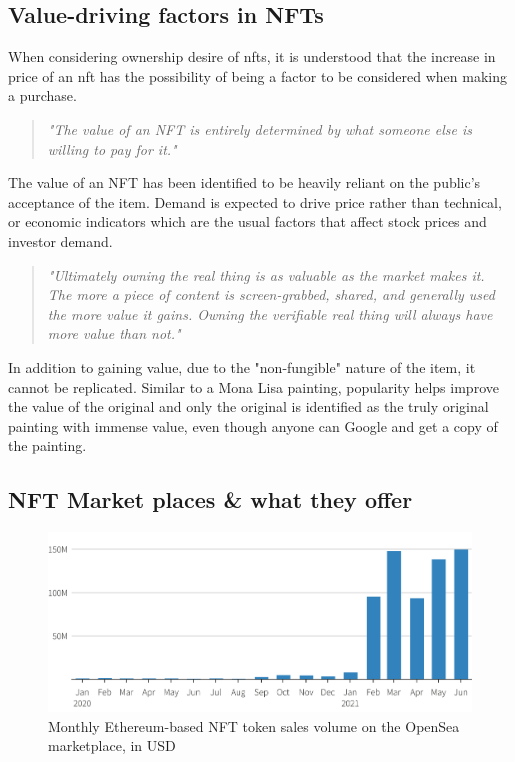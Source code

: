 \subsection{Value-driving factors in NFTs}

When considering ownership desire of \gls{nft}s, it is understood that the increase in price of an \gls{nft} has the possibility of being a factor to be considered when making a purchase.

\begin{quote} 
\centering 
\emph{"The value of an NFT is entirely determined by what someone else is willing to pay for it."}
\\
\raggedleft
\autocite{conti_what_2021}
\end{quote}

The value of an NFT has been identified to be heavily reliant on the public's acceptance of the item. Demand is expected to drive price rather than technical, or economic indicators which are the usual factors that affect stock prices and investor demand.

\begin{quote} 
\centering 
\emph{"Ultimately owning the real thing is as valuable as the market makes it. The more a piece of content is screen-grabbed, shared, and generally used the more value it gains. Owning the verifiable real thing will always have more value than not."}
\\
\raggedleft
\autocite{noauthor_erc-721_nodate}
\end{quote}

In addition to gaining value, due to the "non-fungible" nature of the item, it cannot be replicated. Similar to a Mona Lisa painting, popularity helps improve the value of the original and only the original is identified as the truly original painting with immense value, even though anyone can Google and get a copy of the painting.


\subsection{NFT Market places \& what they offer}

\begin{figure}[h!]
\centering
\includegraphics[width=12cm]{images/LR/NFT-sales-opensea.png}
\caption{Monthly Ethereum-based NFT token sales volume on the OpenSea marketplace, in USD \autocite{howcroft_nft_2021}}
\end{figure}

